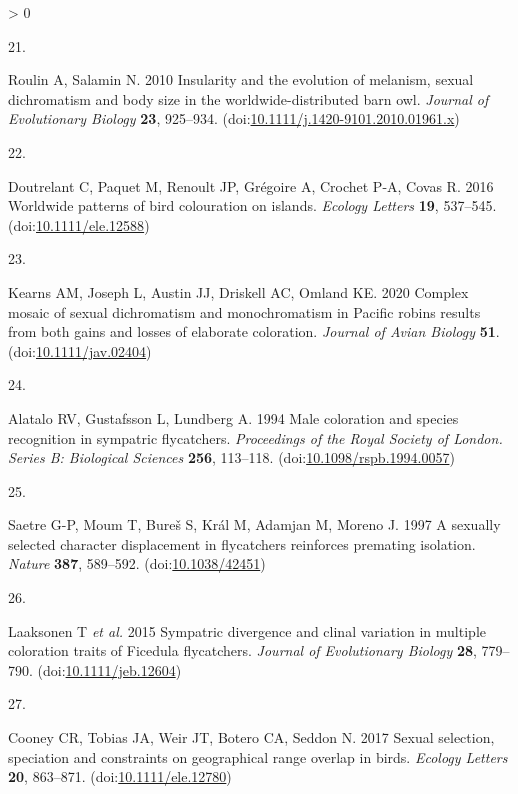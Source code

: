 \documentclass[
  a4paper,
]{article}
\newlength{\cslhangindent}
\newlength{\csllabelwidth}
\newenvironment{CSLReferences}[2] %
 {%
  \setlength{\parindent}{0pt}
  \ifodd #1 \everypar{\setlength{\hangindent}{\cslhangindent}}\ignorespaces\fi
  \ifnum #2 > 0
  \setlength{\parskip}{#2\baselineskip}
  \fi
 }%
 {}
\newcommand{\CSLLeftMargin}[1]{\parbox[t]{\csllabelwidth}{#1}}
\newcommand{\CSLRightInline}[1]{\parbox[t]{\linewidth - \csllabelwidth}{#1}\break}
\begin{document}
\begin{CSLReferences}{0}{0}
\leavevmode\hypertarget{ref-roulin2010}{}%
\CSLLeftMargin{21. }
\CSLRightInline{Roulin A, Salamin N. 2010 Insularity and the evolution
of melanism, sexual dichromatism and body size in the
worldwide-distributed barn owl. \emph{Journal of Evolutionary Biology}
\textbf{23}, 925--934.
(doi:\href{https://doi.org/10.1111/j.1420-9101.2010.01961.x}{10.1111/j.1420-9101.2010.01961.x})}

\leavevmode\hypertarget{ref-doutrelant2016}{}%
\CSLLeftMargin{22. }
\CSLRightInline{Doutrelant C, Paquet M, Renoult JP, Grégoire A, Crochet
P-A, Covas R. 2016 Worldwide patterns of bird colouration on islands.
\emph{Ecology Letters} \textbf{19}, 537--545.
(doi:\href{https://doi.org/10.1111/ele.12588}{10.1111/ele.12588})}

\leavevmode\hypertarget{ref-kearns2020}{}%
\CSLLeftMargin{23. }
\CSLRightInline{Kearns AM, Joseph L, Austin JJ, Driskell AC, Omland KE.
2020 Complex mosaic of sexual dichromatism and monochromatism in
{Pacific} robins results from both gains and losses of elaborate
coloration. \emph{Journal of Avian Biology} \textbf{51}.
(doi:\href{https://doi.org/10.1111/jav.02404}{10.1111/jav.02404})}

\leavevmode\hypertarget{ref-alatalo1994}{}%
\CSLLeftMargin{24. }
\CSLRightInline{Alatalo RV, Gustafsson L, Lundberg A. 1994 Male
coloration and species recognition in sympatric flycatchers.
\emph{Proceedings of the Royal Society of London. Series B: Biological
Sciences} \textbf{256}, 113--118.
(doi:\href{https://doi.org/10.1098/rspb.1994.0057}{10.1098/rspb.1994.0057})}

\leavevmode\hypertarget{ref-saetre1997}{}%
\CSLLeftMargin{25. }
\CSLRightInline{Saetre G-P, Moum T, Bureš S, Král M, Adamjan M, Moreno
J. 1997 A sexually selected character displacement in flycatchers
reinforces premating isolation. \emph{Nature} \textbf{387}, 589--592.
(doi:\href{https://doi.org/10.1038/42451}{10.1038/42451})}

\leavevmode\hypertarget{ref-laaksonen2015}{}%
\CSLLeftMargin{26. }
\CSLRightInline{Laaksonen T \emph{et al.} 2015 Sympatric divergence and
clinal variation in multiple coloration traits of {Ficedula}
flycatchers. \emph{Journal of Evolutionary Biology} \textbf{28},
779--790.
(doi:\href{https://doi.org/10.1111/jeb.12604}{10.1111/jeb.12604})}

\leavevmode\hypertarget{ref-cooney2017}{}%
\CSLLeftMargin{27. }
\CSLRightInline{Cooney CR, Tobias JA, Weir JT, Botero CA, Seddon N. 2017
Sexual selection, speciation and constraints on geographical range
overlap in birds. \emph{Ecology Letters} \textbf{20}, 863--871.
(doi:\href{https://doi.org/10.1111/ele.12780}{10.1111/ele.12780})}


\end{CSLReferences}
\end{document}
